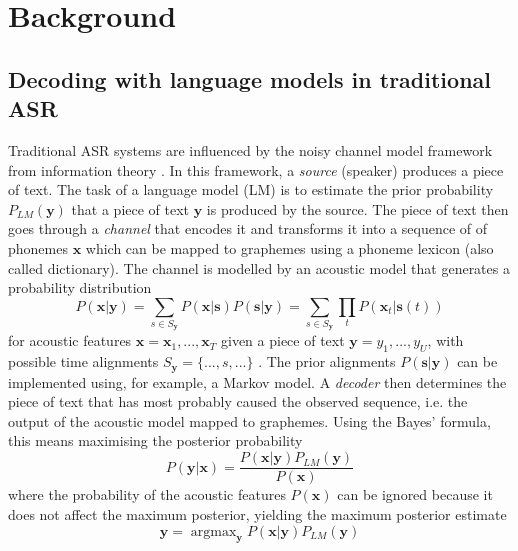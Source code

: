 \documentclass[11pt]{article}
\DeclareMathOperator*{\argmax}{argmax}
\begin{document}
\section{Background}
\subsection{Decoding with language models in traditional ASR}
Traditional ASR systems are influenced by the noisy channel model framework from information theory \citep{Jelinek1976}. In this framework, a \emph{source} (speaker) produces a piece of text. The task of a language model (LM) is to estimate the prior probability $P_{LM}(\boldsymbol{y})$ that a piece of text $\boldsymbol{y}$ is produced by the source. The piece of text then goes through a \emph{channel} that encodes it and transforms it into a sequence of of phonemes $\boldsymbol{x}$ which can be mapped to graphemes using a phoneme lexicon (also called dictionary).
The channel is modelled by an acoustic model that generates a probability distribution
\begin{equation}
    P(\boldsymbol{x}|\boldsymbol{y}) =
    \sum_{s \in S_{\boldsymbol{y}}}P(\boldsymbol{x}|\boldsymbol{s})
    P(\boldsymbol{s}|\boldsymbol{y}) =
    \sum_{s \in S_{\boldsymbol{y}}}\prod_t P(\boldsymbol{x}_t|\boldsymbol{s}(t)) 
\end{equation}
for acoustic features $\boldsymbol x = \boldsymbol x_1,...,\boldsymbol x_T$ given a piece of text $\boldsymbol y = y_1,..., y_U$, with possible time alignments $S_{\boldsymbol{y}}=\{...,s,...\}$ \citep{Mcdermott}. The prior alignments $P(\boldsymbol{s}|\boldsymbol{y})$ can be implemented using, for example, a Markov model.
A \emph{decoder} then determines the piece of text that has most probably caused the observed sequence, i.e. the output of the acoustic model mapped to graphemes. Using the Bayes' formula, this means maximising the posterior probability
\begin{equation}\label{bayes}
    P(\boldsymbol{y}|\boldsymbol{x}) = 
    \frac{P(\boldsymbol{x}|\boldsymbol{y})P_{LM}(\boldsymbol{y})} {P(\boldsymbol{x})}
\end{equation} 
where the probability of the acoustic features $P(\boldsymbol{x})$ can be ignored because it does not affect the maximum posterior, yielding the maximum posterior estimate
\begin{equation}\label{map}
    \hat{\boldsymbol{y}} = \argmax_{\boldsymbol{y}}
    P(\boldsymbol{x}|\boldsymbol{y})P_{LM}(\boldsymbol{y})
\end{equation} 
\end{document}
